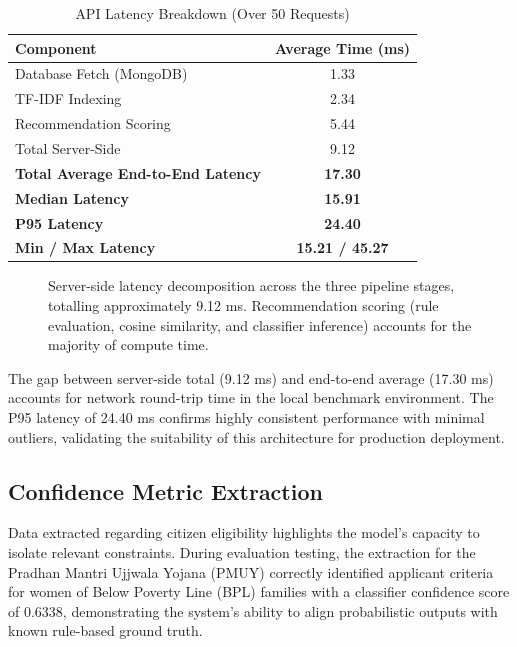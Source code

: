 \documentclass[10pt, journal, twocolumn]{IEEEtran}
\begin{document}
\begin{table}[htbp]
\centering
\caption{API Latency Breakdown (Over 50 Requests)}
\label{tab:latency_metrics}
\begin{tabularx}{\linewidth}{@{}X c@{}}
\toprule
\textbf{Component} & \textbf{Average Time (ms)} \\
\midrule
Database Fetch (MongoDB) & 1.33 \\
TF-IDF Indexing & 2.34 \\
Recommendation Scoring & 5.44 \\
Total Server-Side & 9.12 \\
\midrule
\textbf{Total Average End-to-End Latency} & \textbf{17.30} \\
\textbf{Median Latency} & \textbf{15.91} \\
\textbf{P95 Latency} & \textbf{24.40} \\
\textbf{Min / Max Latency} & \textbf{15.21 / 45.27} \\
\bottomrule
\end{tabularx}
\end{table}

\begin{figure}[htbp]
    \centering
    \caption{Server-side latency decomposition across the three pipeline stages, totalling approximately 9.12 ms. Recommendation scoring (rule evaluation, cosine similarity, and classifier inference) accounts for the majority of compute time.}
    \label{fig:latency_pie}
\end{figure}

The gap between server-side total (9.12 ms) and end-to-end average (17.30 ms) accounts for network round-trip time in the local benchmark environment. The P95 latency of 24.40 ms confirms highly consistent performance with minimal outliers, validating the suitability of this architecture for production deployment.

\subsection{Confidence Metric Extraction}
Data extracted regarding citizen eligibility highlights the model's capacity to isolate relevant constraints. During evaluation testing, the extraction for the Pradhan Mantri Ujjwala Yojana (PMUY) correctly identified applicant criteria for women of Below Poverty Line (BPL) families with a classifier confidence score of 0.6338, demonstrating the system's ability to align probabilistic outputs with known rule-based ground truth.
\end{document}
